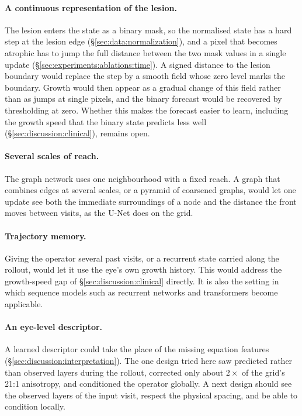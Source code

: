 \paragraph{A continuous representation of the lesion.}
The lesion enters the state as a binary mask, so the normalised state has
a hard step at the lesion edge (\S\ref{sec:data:normalization}), and a
pixel that becomes atrophic has to jump the full distance between the two
mask values in a single update (\S\ref{sec:experiments:ablations:time}).
A signed distance to the lesion boundary would replace the step by a
smooth field whose zero level marks the boundary. Growth would then appear
as a gradual change of this field rather than as jumps at single pixels,
and the binary forecast would be recovered by thresholding at zero.
Whether this makes the forecast easier to learn, including the growth
speed that the binary state predicts less well
(\S\ref{sec:discussion:clinical}), remains open.

\paragraph{Several scales of reach.}
The graph network uses one neighbourhood with a fixed reach. A graph that
combines edges at several scales, or a pyramid of coarsened graphs, would
let one update see both the immediate surroundings of a node and the
distance the front moves between visits, as the U-Net does on the grid.

\paragraph{Trajectory memory.}
Giving the operator several past visits, or a recurrent state carried
along the rollout, would let it use the eye's own growth history. This
would address the growth-speed gap of \S\ref{sec:discussion:clinical}
directly. It is also the setting in which sequence models such as
recurrent networks and transformers become applicable.

\paragraph{An eye-level descriptor.}
A learned descriptor could take the place of the missing equation
features (\S\ref{sec:discussion:interpretation}). The one design tried
here saw predicted rather than observed layers during the rollout,
corrected only about $2\times$ of the grid's 21:1 anisotropy, and
conditioned the operator globally. A next design should see the observed
layers of the input visit, respect the physical spacing, and be able to
condition locally.

